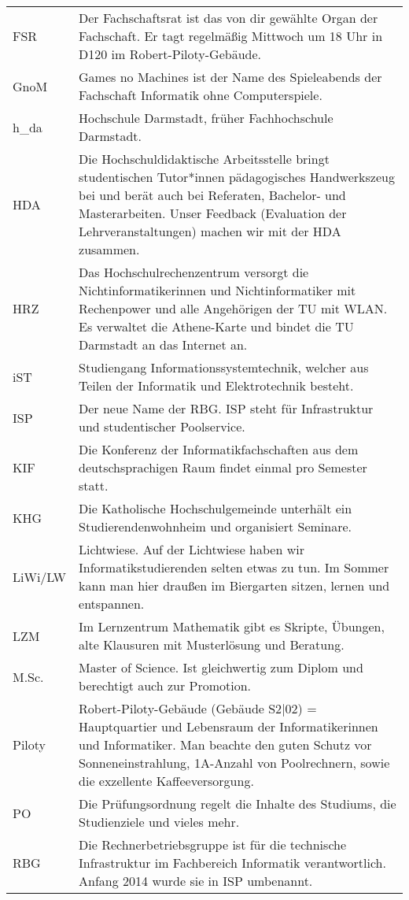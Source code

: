 \begin{longtable}{p{20mm}p{85mm}}
FSR		&	Der Fachschaftsrat ist das von dir gewählte Organ der Fachschaft. Er tagt regelmäßig Mittwoch um 18 Uhr in D120 im Robert-Piloty-Gebäude.\\
GnoM	&	Games no Machines ist der Name des Spieleabends der Fachschaft Informatik ohne Computerspiele.\\
h\_da	&	Hochschule Darmstadt, früher Fachhochschule Darmstadt.\\
HDA		&	Die Hochschuldidaktische Arbeitsstelle bringt studentischen Tutor*innen pädagogisches Handwerkszeug bei und berät auch bei Referaten, Bachelor- und Masterarbeiten. Unser Feedback (Evaluation der Lehrveranstaltungen) machen wir mit der HDA zusammen.\\
HRZ		&	Das Hochschulrechenzentrum versorgt die Nichtinformatikerinnen und Nichtinformatiker mit Rechenpower und alle Angehörigen der TU mit WLAN. Es verwaltet die Athene-Karte und bindet die TU Darmstadt an das Internet an.\\
iST		&	Studiengang Informationssystemtechnik, welcher aus Teilen der Informatik und Elektrotechnik besteht.\\
ISP		&	Der neue Name der RBG. ISP steht für Infrastruktur und studentischer Poolservice.\\
KIF		&	Die Konferenz der Informatikfachschaften aus dem deutschsprachigen Raum findet einmal pro Semester statt.\\
KHG		&	Die Katholische Hochschulgemeinde unterhält ein Studierendenwohnheim und organisiert Seminare.\\
LiWi/LW	&	Lichtwiese. Auf der Lichtwiese haben wir Informatikstudierenden selten etwas zu tun. Im Sommer kann man hier draußen im Biergarten sitzen, lernen und entspannen.\\
LZM		&	Im Lernzentrum Mathematik gibt es Skripte, Übungen, alte Klausuren mit Musterlösung und Beratung.\\
M.Sc.	&	Master of Science. Ist gleichwertig zum Diplom und berechtigt auch zur Promotion.\\
Piloty	&	Robert-Piloty-Gebäude (Gebäude S2$|$02) = Hauptquartier und Lebensraum der Informatikerinnen und Informatiker. Man beachte den guten Schutz vor Sonneneinstrahlung, 1A-Anzahl von Poolrechnern, sowie die exzellente Kaffeeversorgung.\\
PO		&	Die Prüfungsordnung regelt die Inhalte des Studiums, die Studienziele und vieles mehr.\\
RBG		&	Die Rechnerbetriebsgruppe ist für die technische Infrastruktur im Fachbereich Informatik verantwortlich. Anfang 2014 wurde sie in ISP umbenannt.\\

\end{longtable}
